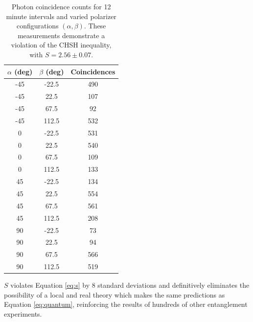 \documentclass{article}
\begin{document}
\begin{table}[!h]
\centering
\caption{Photon coincidence counts for 12 minute intervals and varied polarizer configurations $(\alpha, \beta)$. These measurements demonstrate a violation of the CHSH inequality, with $S=2.56 \pm 0.07$.}
\label{table}
\begin{tabular}{ccc}
$\alpha$ (deg) & $\beta$ (deg) & Coincidences \\ \hline
    -45  & -22.5 & 490          \\
    -45  & 22.5  & 107          \\
    -45  & 67.5  & 92           \\
    -45  & 112.5 & 532          \\
    0    & -22.5 & 531          \\
    0    & 22.5  & 540          \\
    0    & 67.5  & 109          \\
    0    & 112.5 & 133          \\
    45   & -22.5 & 134          \\
    45   & 22.5  & 554          \\
    45   & 67.5  & 561          \\
    45   & 112.5 & 208          \\
    90   & -22.5 & 73           \\
    90   & 22.5  & 94           \\
    90   & 67.5  & 566          \\
    90   & 112.5 & 519
\end{tabular}
\end{table}

$S$ violates Equation \ref{eq:s} by 8 standard deviations and definitively eliminates the possibility of a local and real theory which makes the same predictions as Equation \ref{eq:quantum}, reinforcing the results of hundreds of other entanglement experiments.

\pagebreak
\end{document}
